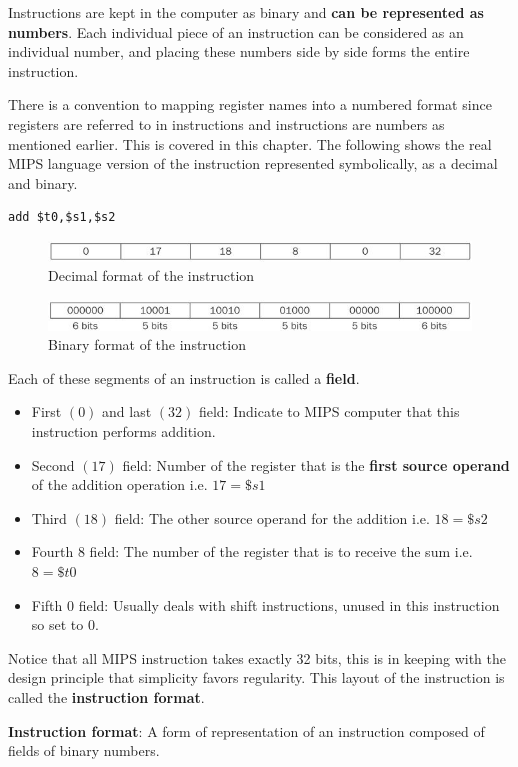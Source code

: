 \documentclass[10pt,a4paper]{article}
\begin{document}
Instructions are kept in the computer as binary and \textbf{can be represented as numbers}. Each individual
piece of an instruction can be considered as an individual number, and placing these numbers side by
side forms the entire instruction.

There is a convention to mapping register names into a numbered format since registers are referred
to in instructions and instructions are numbers as mentioned earlier. This is covered in this
chapter.
\pagebreak
The following shows the real MIPS language version of the instruction represented symbolically, as a
decimal and binary.
\begin{lstlisting}[numbers=none]
    add $t0,$s1,$s2
\end{lstlisting}
\begin{figure} [h!]
    \centering
    \includegraphics[scale=0.7]{Decimal example.JPG}
    \caption{Decimal format of the instruction}
\end{figure}
\begin{figure} [h!]
    \centering
    \includegraphics[scale=0.7]{Binary example.JPG}
    \caption{Binary format of the instruction}
\end{figure}

Each of these segments of an instruction is called a \textbf{field}.
\begin{itemize}
    \item  First $(0)$ and last $(32)$ field: Indicate to MIPS computer that this instruction performs addition.
    \item  Second $(17)$ field: Number of the register that is the \textbf{first source operand} of
    the addition operation i.e. $17 = \$s1$
    \item Third $(18)$ field: The other source operand for the addition i.e. $18 = \$s2$
    \item Fourth $8$ field: The number of the register that is to receive the sum i.e. $8 = \$t0$
    \item Fifth $0$ field: Usually deals with shift instructions, unused in this instruction so set to $0$.
\end{itemize}

Notice that all MIPS instruction takes exactly 32 bits, this is in keeping with the design principle
that simplicity favors regularity. This layout of the instruction is called the \textbf{instruction
format}.
\begin{tcolorbox}[breakable,colback=white]
\textbf{Instruction format}: A form of representation of an instruction composed of fields of binary numbers.
\end{tcolorbox}
\end{document}
